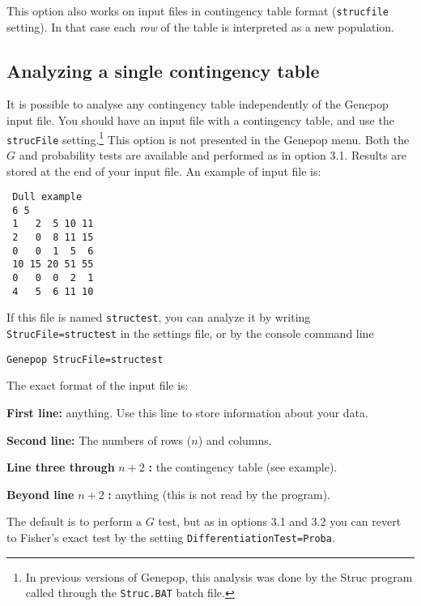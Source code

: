 \documentclass[12pt,]{book}
\let\rmarkdownfootnote\footnote%
\def\footnote{\protect\rmarkdownfootnote}
\begin{document}

This option also works on input files in contingency table format
(\texttt{strucfile} setting). In that case each \emph{row} of the table
is interpreted as a new population.

\subsection{Analyzing a single contingency
table}\label{analyzing-a-single-contingency-table}

 It is possible to
analyse any contingency table independently of the Genepop input file.
You should have an input file with a contingency table, and use the
\texttt{strucFile}
setting.\footnote{In previous versions of Genepop,
  this analysis was done by the Struc program called through the
  \texttt{Struc.BAT} batch file.} This option is not presented in the
Genepop menu. Both the \(G\) and probability tests are available and
performed as in option 3.1. Results are stored at the end of your input
file. An example of input file is:

\begin{verbatim}
 Dull example
 6 5
 1   2  5 10 11
 2   0  8 11 15
 0   0  1  5  6
 10 15 20 51 55
 0   0  0  2  1
 4   5  6 11 10
\end{verbatim}

If this file is named \texttt{structest}, you can analyze it by writing
\texttt{StrucFile=structest} in the settings file, or by the console
command line

\begin{verbatim}
Genepop StrucFile=structest
\end{verbatim}

The exact format of the input file is:

\textbf{First line:} anything. Use this line to store information about
your data.

\textbf{Second line:} The numbers of rows (\(n\)) and columns.

\textbf{Line three through} \(n+2\) \textbf{:} the contingency table
(see example).

\textbf{Beyond line} \(n+2\) \textbf{:} anything (this is not read by
the program).

The default is to perform a \(G\) test, but as in options 3.1 and 3.2
you can revert to Fisher's exact test by the setting
\texttt{DifferentiationTest=Proba}.
\end{document}
